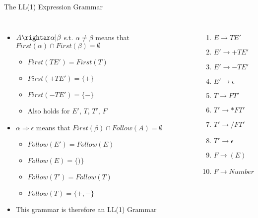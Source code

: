 \documentclass[handout]{beamer}
\newenvironment{code}{%
 \VerbatimEnvironment
 \begin{adjustbox}{max width=\textwidth, max height=0.7\textheight}
 \begin{BVerbatim}
  }{
  \end{BVerbatim}
 \end{adjustbox}
}
\begin{document}
\begin{frame}{The LL(1) Expression Grammar}
\begin{columns}
    \begin{itemize}[<+->]
        \item $A \rightar \alpha | \beta$ s.t. $\alpha \neq \beta$ means that $First(\alpha)\cap First(\beta) = \emptyset$
        \begin{itemize}
            \item $First(TE') = First(T)$
            \item $First(+TE') = \{+\}$
            \item $First(-TE') = \{-\}$
            \item Also holds for $E'$, $T$, $T'$, $F$
        \end{itemize}
        \item $\alpha \Rightarrow \epsilon$ means that $First(\beta)\cap Follow(A)=\emptyset$
        \begin{itemize}
            \item $Follow(E')=Follow(E)$
            \item $Follow(E)=\{)\}$
            \item $Follow(T')=Follow(T)$
            \item $Follow(T)=\{+,-\}$
        \end{itemize}
        \item This grammar is therefore an LL(1) Grammar
    \end{itemize}
\begin{enumerate}
    \item $E \rightarrow TE'$
    \item $E' \rightarrow +TE'$
    \item $E' \rightarrow -TE'$
    \item $E' \rightarrow \epsilon$
    \item $T \rightarrow FT'$
    \item $T' \rightarrow *FT'$
    \item $T' \rightarrow /FT'$
    \item $T' \rightarrow \epsilon$
    \item $F \rightarrow (E)$
    \item $F \rightarrow Number$
\end{enumerate}
\end{columns}
\end{frame}

\ifdefined\PYTHON
{}
\fi
\end{document}
